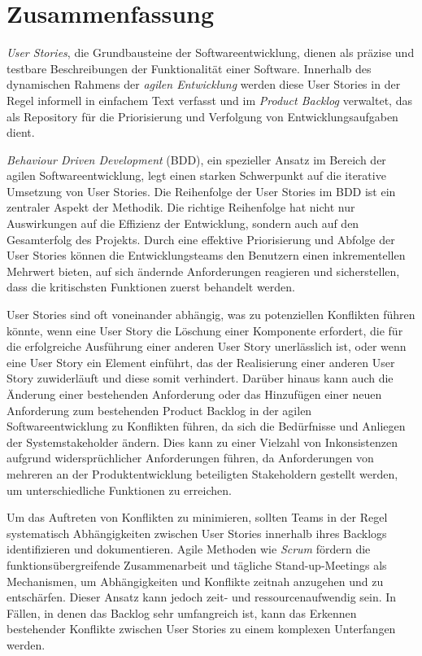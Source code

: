 \section*{Zusammenfassung}
\emph{User Stories}, die Grundbausteine der Softwareentwicklung, dienen als präzise und testbare Beschreibungen der Funktionalität einer Software. Innerhalb des dynamischen Rahmens der \emph{agilen Entwicklung} werden diese User Stories in der Regel informell in einfachem Text verfasst und im \emph{Product Backlog} verwaltet, das als Repository für die Priorisierung und Verfolgung von Entwicklungsaufgaben dient.

\emph{Behaviour Driven Development} (BDD), ein spezieller Ansatz im Bereich der agilen Softwareentwicklung, legt einen starken Schwerpunkt auf die iterative Umsetzung von User Stories. Die Reihenfolge der User Stories im BDD ist ein zentraler Aspekt der Methodik. Die richtige Reihenfolge hat nicht nur Auswirkungen auf die Effizienz der Entwicklung, sondern auch auf den Gesamterfolg des Projekts. Durch eine effektive Priorisierung und Abfolge der User Stories können die Entwicklungsteams den Benutzern einen inkrementellen Mehrwert bieten, auf sich ändernde Anforderungen reagieren und sicherstellen, dass die kritischsten Funktionen zuerst behandelt werden.

User Stories sind oft voneinander abhängig, was zu potenziellen Konflikten führen könnte, wenn eine User Story die Löschung einer Komponente erfordert, die für die erfolgreiche Ausführung einer anderen User Story unerlässlich ist, oder wenn eine User Story ein Element einführt, das der Realisierung einer anderen User Story zuwiderläuft und diese somit verhindert. Darüber hinaus kann auch die Änderung einer bestehenden Anforderung oder das Hinzufügen einer neuen Anforderung zum bestehenden Product Backlog in der agilen Softwareentwicklung zu Konflikten führen, da sich die Bedürfnisse und Anliegen der Systemstakeholder ändern. Dies kann zu einer Vielzahl von Inkonsistenzen aufgrund widersprüchlicher Anforderungen führen, da Anforderungen von mehreren an der Produktentwicklung beteiligten Stakeholdern gestellt werden, um unterschiedliche Funktionen zu erreichen.

Um das Auftreten von Konflikten zu minimieren, sollten Teams in der Regel systematisch Abhängigkeiten zwischen User Stories innerhalb ihres Backlogs identifizieren und dokumentieren. Agile Methoden wie \emph{Scrum} fördern die funktionsübergreifende Zusammenarbeit und tägliche Stand-up-Meetings als Mechanismen, um Abhängigkeiten und Konflikte zeitnah anzugehen und zu entschärfen. Dieser Ansatz kann jedoch zeit- und ressourcenaufwendig sein. In Fällen, in denen das Backlog sehr umfangreich ist, kann das Erkennen bestehender Konflikte zwischen User Stories zu einem komplexen Unterfangen werden.

